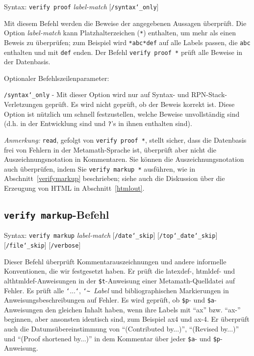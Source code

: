 Syntax:  \texttt{verify proof} {\em label-match} [\texttt{/syntax{\char`\_}only}]

Mit diesem Befehl werden die Beweise der angegebenen Aussagen überprüft.  Die Option {\em label-match} kann Platzhalterzeichen (\texttt{*}) enthalten, um mehr als einen Beweis zu überprüfen; zum Beispiel wird \verb/*abc*def/ auf alle Labels passen, die \texttt{abc} enthalten und mit \texttt{def} enden. Der Befehl \texttt{verify proof *} prüft alle Beweise in der Datenbasis.

Optionaler Befehlszeilenparameter:

    \texttt{/syntax{\char`\_}only} - Mit dieser Option wird nur auf Syntax- und RPN-Stack-Verletzungen geprüft.  Es wird nicht geprüft, ob der Beweis korrekt ist.  Diese Option ist nützlich um schnell festzustellen, welche Beweise unvollständig sind (d.h. in der Entwicklung sind und \texttt{?}'s in ihnen enthalten sind).

{\em Anmerkung:} \texttt{read}, gefolgt von \texttt{verify proof *}, stellt sicher, dass die Datenbasis frei von Fehlern in der Metamath-Sprache ist, überprüft aber nicht die Auszeichnungsnotation in Kommentaren. Sie können die Auszeichnungsnotation auch überprüfen, indem Sie \texttt{verify markup *} ausführen, wie in Abschnitt~\ref{verifymarkup} beschrieben; siehe auch die Diskussion über die Erzeugung von {\sc HTML} in Abschnitt~\ref{htmlout}.


\subsection{\texttt{verify markup}-Befehl}\label{verifymarkup}

Syntax:  \texttt{verify markup} {\em label-match}
[\texttt{/date{\char`\_}skip}]
[\texttt{/top{\char`\_}date{\char`\_}skip}] {\\}
[\texttt{/file{\char`\_}skip}]
[\texttt{/verbose}]

Dieser Befehl überprüft Kommentarauszeichnungen und andere informelle Konventionen, die wir festgesetzt haben.  Er prüft die latexdef-, htmldef- und althtmldef-Anweisungen in der \texttt{\$t}-Anweisung einer Metamath-Quelldatei auf Fehler. Es prüft alle \texttt{`}...\texttt{`}, \texttt{\char`\~}~\textit{Label} und bibliographischen Markierungen in Anweisungsbeschreibungen auf Fehler. Es wird geprüft, ob \texttt{\$p}- und \texttt{\$a}-Anweisungen den gleichen Inhalt haben, wenn ihre Labels mit "`ax"' bzw. "`ax-"' beginnen, aber ansonsten identisch sind, zum Beispiel ax4 und ax-4. Er überprüft auch die Datumsübereinstimmung von "`(Contributed by...)"', "`(Revised by...)"' und "`(Proof shortened by...)"' in dem Kommentar über jeder \texttt{\$a}- und \texttt{\$p}-Anweisung.


